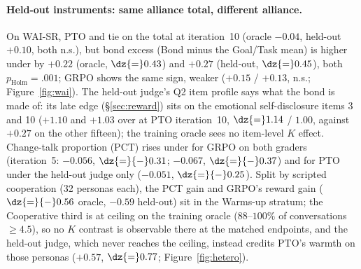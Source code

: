 \paragraph{Held-out instruments: same alliance total, different alliance.} On WAI-SR, PTO \Kf{}
and \Kz{} tie on the total at iteration~10 (oracle $-0.04$, held-out $+0.10$, both n.s.), but
bond excess (Bond minus the Goal/Task mean) is higher under \Kz{} by $+0.22$ (oracle,
$\dz{=}0.43$) and $+0.27$ (held-out, $\dz{=}0.45$), both $p_{\text{Holm}}{=}.001$; GRPO shows the
same sign, weaker ($+0.15$ / $+0.13$, n.s.; Figure~\ref{fig:wai}). The
held-out judge's Q2 item profile says what the bond is made of: its late \Kz{} edge
(\S\ref{sec:reward}) sits on the emotional self-disclosure items 3 and 10 ($+1.10$ and $+1.03$
over \Kf{} at PTO iteration~10, $\dz{=}1.14$ / $1.00$, against $+0.27$ on the other fifteen);
the training oracle sees no item-level $K$ effect. Change-talk proportion (PCT)
rises under \Kf{} for GRPO on both graders (iteration~5: $-0.056$, $\dz{=}{-}0.31$; $-0.067$,
$\dz{=}{-}0.37$) and for PTO under the held-out judge only ($-0.051$, $\dz{=}{-}0.25$). Split by
scripted cooperation (32 personas each), the PCT gain and GRPO's reward gain (\QQ{}
$\dz{=}{-}0.56$ oracle, ${-}0.59$ held-out) sit in the Warms-up stratum; the Cooperative third
is at ceiling on the training oracle ($88$--$100\%$ of conversations $\geq 4.5$), so no $K$
contrast is observable there at the matched endpoints, and the held-out judge, which never reaches the ceiling, instead
credits \Kz{} PTO's warmth on those personas ($+0.57$, $\dz{=}0.77$; Figure~\ref{fig:hetero}).
